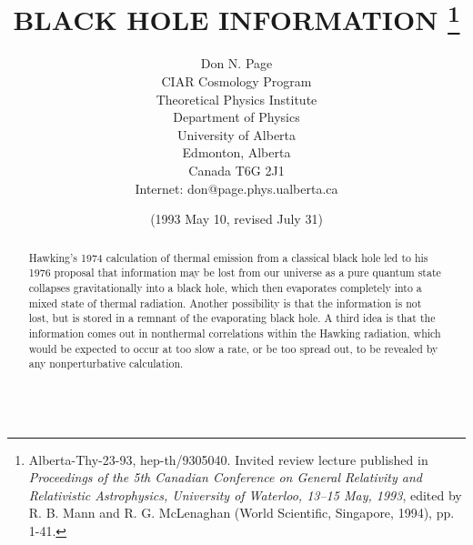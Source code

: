 
\textwidth 15cm
\textheight 22cm
\topmargin -10mm

\title{BLACK HOLE INFORMATION \thanks
{Alberta-Thy-23-93, hep-th/9305040.
Invited review lecture published in {\em Proceedings of the
5th Canadian Conference on General Relativity and Relativistic
Astrophysics,
University of Waterloo, 13--15 May, 1993}, edited by R. B. Mann and
R. G. McLenaghan (World Scientific, Singapore, 1994), pp. 1-41.}}
\author{ Don N. Page\\
CIAR Cosmology Program\\
Theoretical Physics Institute\\
Department of Physics\\University of Alberta\\
Edmonton, Alberta\\Canada T6G 2J1\\
Internet:  don@page.phys.ualberta.ca}
\date{(1993 May 10, revised July 31)}
\maketitle
\large
\begin{abstract}
\baselineskip 16pt

     Hawking's 1974 calculation of thermal emission
from a classical black hole led to his 1976 proposal
that information may be lost from our universe as a
pure quantum state collapses gravitationally into a
black hole, which then evaporates completely into
a mixed state of thermal radiation.  Another possibility
is that the information is not lost, but is stored in a
remnant of the evaporating black hole.  A third idea
is that the information comes out in nonthermal
correlations within the Hawking radiation, which
would be expected to occur at too slow a rate,
or be too spread out, to be revealed by any
nonperturbative calculation.
\\
\\
\end{abstract}
\normalsize
\pagebreak
\baselineskip 17pt


